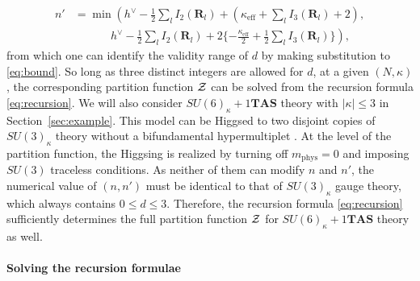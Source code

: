 \documentclass[letterpaper, 11pt]{article}
\newcommand{\nn}{\nonumber}
\def\CZ{{\cal Z}}
\def\k{\kappa}
\begin{document}
{\begin{align}
  n' &= \min \textstyle 
  \left(h^\vee - \frac{1}{2} \sum_{l}I_2(\mathbf{R}_l) + (\k_\text{eff}+\sum_{l}I_3(\mathbf{R}_l)+2),\right. \\& \left. \qquad \quad \ \textstyle h^\vee - \frac{1}{2} \sum_{l}I_2(\mathbf{R}_l) + 2\{-\frac{\k_\text{eff}}{2}+\frac{1}{2}\sum_{l}I_3(\mathbf{R}_l)\}\right), \nn
\end{align}
from which one can identify the validity range of $d$ by making substitution to \eqref{eq:bound}. So long as three distinct integers are allowed for $d$, at a given $(N, \kappa)$, the corresponding partition function $\CZ$ can be solved from the recursion formula \eqref{eq:recursion}. We will also consider $SU(6)_\kappa  + 1 \mathbf{TAS}$ theory with $|\kappa| \leq 3$ in Section~\ref{sec:example}. This model can be Higgsed to two disjoint copies of $SU(3)_\kappa$ theory without a bifundamental hypermultiplet \cite{Hayashi:2019yxj}. At the level of the partition function, the Higgsing is realized by turning off $m_\text{phys} = 0$ and imposing $SU(3)$ traceless conditions. As neither of them can modify $n$ and $n'$, the numerical value of $(n,n')$ must be identical to that of $SU(3)_\kappa$ gauge theory, which always contains $0\leq d \leq 3$. Therefore, the recursion formula \eqref{eq:recursion} sufficiently determines the full partition function $\CZ$ for $SU(6)_\kappa  + 1 \mathbf{TAS}$ theory as well.


\paragraph{Solving the recursion formulae}

}
\end{document}
